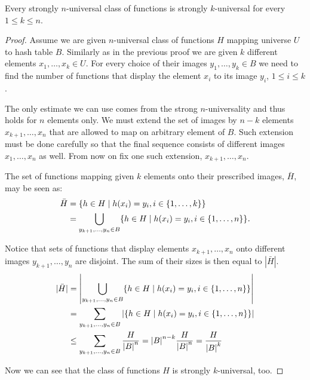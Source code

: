 \begin{remark}
Every strongly $n$-universal class of functions is strongly $k$-universal for every $1 \leq k \leq n$.
\end{remark}
\begin{proof}
Assume we are given $n$-universal class of functions $H$ mapping universe $U$ to hash table $B$. Similarly as in the previous proof we are given $k$ different elements $x_1, \dots, x_k \in U$. For every choice of their images $y_1, \dots, y_k \in B$ we need to find the number of functions that display the element $x_i$ to its image $y_i$, $1 \leq i \leq k$. 

The only estimate we can use comes from the strong $n$-universality and thus holds for $n$ elements only. We must extend the set of images by $n - k$ elements $x_{k + 1}, \dots, x_n$ that are allowed to map on arbitrary element of $B$. Such extension must be done carefully so that the final sequence consists of different images $x_1, \dots, x_n$ as well. From now on fix one such extension, $x_{k + 1}, \dots, x_n$.

The set of functions mapping given $k$ elements onto their prescribed images, $\bar H$, may be seen as:
\[
\begin{split}
\bar{H}	& = \lbrace h \in H \mid h(x_i) = y_i, i \in \lbrace 1, \dots, k \rbrace \rbrace \\
	& = \displaystyle \bigcup_{y_{k+1}, \dots, y_n \in B} \lbrace h \in H \mid h(x_i) = y_i, i \in \lbrace 1, \dots, n \rbrace \rbrace \textit{.}
\end{split}
\]

Notice that sets of functions that display elements $x_{k + 1}, \dots, x_n$ onto different images $y_{k + 1}, \dots, y_n$ are disjoint. The sum of their sizes is then equal to $|\bar H|$.
\[
\begin{split}
|\bar H|& = \left| \displaystyle \bigcup_{y_{k+1}, \dots, y_n \in B} \lbrace h \in H \mid h(x_i) = y_i, i \in \lbrace 1, \dots, n \rbrace \rbrace \right| \\
	& = \displaystyle \sum_{y_{k+1}, \dots, y_n \in B} \left| \lbrace h \in H \mid h(x_i) = y_i, i \in \lbrace 1, \dots, n \rbrace \rbrace \right| \\
	& \leq \displaystyle \sum_{y_{k+1}, \dots, y_n \in B} \frac{H}{{|B|}^{n}} = {|B|}^{n - k} \frac{H}{{|B|}^{n}} = \frac{H}{{|B|}^{k}}
\end{split}
\]

Now we can see that the class of functions $H$ is strongly $k$-universal, too.
\end{proof}

